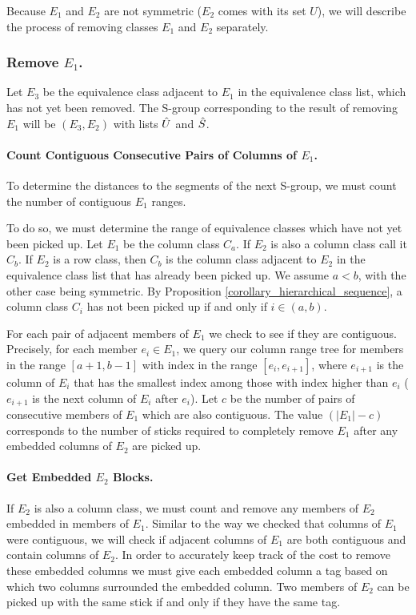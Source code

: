 Because $E_1$ and $E_2$ are not symmetric ($E_2$ comes with its set $U$), we will describe the process of removing classes $E_1$ and $E_2$ separately.


\subsubsection{Remove $E_1$.}
Let $E_3$ be the equivalence class adjacent to $E_1$ in the equivalence class list, which has not yet been removed.
The S-group corresponding to the result of removing $E_1$ will be $(E_3,E_2)$
with lists $\hat{U}$ and $\hat{S}$.

\paragraph{Count Contiguous Consecutive Pairs of Columns of $E_1$.}
To determine the distances to the segments of the next S-group,
we must count the number of contiguous $E_1$ ranges.

To do so, we must determine the range of equivalence classes which have not yet been picked up.
Let $E_1$ be the column class $C_a$.
If $E_2$ is also a column class call it $C_b$.
If $E_2$ is a row class, then $C_b$ is the column class adjacent to $E_2$ in the equivalence class list that has already been picked up.
We assume $a<b$, with the other case being symmetric.
By Proposition \ref{corollary_hierarchical_sequence},
 a column class $C_i$ has not been picked up if and only if $i\in (a,b)$.


For each pair of adjacent members of $E_1$ we check to see if
they are contiguous.
Precisely, for each member $e_i \in E_1$, we query our column range tree for members in the range $[a+1,b-1]$ with index in the range $[e_i,e_{i+1}]$,
where $e_{i+1}$ is the column of $E_i$ that has the smallest index
among those with index higher than $e_i$ ($e_{i+1}$ is the next column of $E_i$
after $e_i$).
Let $c$ be the number of pairs of consecutive members of $E_1$ which are also contiguous.
The value $(|E_1| - c)$ corresponds to the number of sticks required to completely remove $E_1$ after any embedded columns of $E_2$ are picked up.

\paragraph{Get Embedded $E_2$ Blocks.}
If $E_2$ is also a column class, we must count and remove any members of $E_2$ embedded in members of $E_1$.
Similar to the way we checked that columns of $E_1$ were contiguous, we will check if adjacent columns of $E_1$ are both contiguous and contain columns of $E_2$.
In order to accurately keep track of the cost to remove these embedded columns we must give each embedded column a tag based on which two columns surrounded the embedded column.
Two members of $E_2$ can be picked up with the same stick if and only if they have the same tag.

